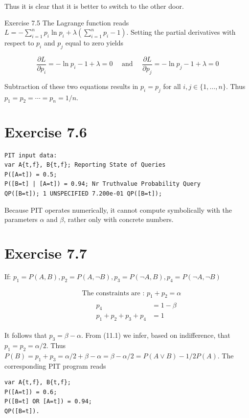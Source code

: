 \documentclass[10pt]{book}
\begin{document}
\begin{center}
\begin{enumerate}
\begin{center}
\begin{center}
\begin{center}
\begin{center}
\begin{center}
Thus it is clear that it is better to switch to the other door.

Exercise 7.5 The Lagrange function reads $L=-\sum_{i=1}^{n} p_{i} \ln p_{i}+\lambda\left(\sum_{i=1}^{n} p_{i}-1\right)$. Setting the partial derivatives with respect to $p_{i}$ and $p_{j}$ equal to zero yields

$$
\frac{\partial L}{\partial p_{i}}=-\ln p_{i}-1+\lambda=0 \quad \text { and } \quad \frac{\partial L}{\partial p_{j}}=-\ln p_{j}-1+\lambda=0
$$

Subtraction of these two equations results in $p_{i}=p_{j}$ for all $i, j \in\{1, \ldots, n\}$. Thus $p_{1}=p_{2}=\cdots=p_{n}=1 / n$.

\section*{Exercise 7.6}
\begin{verbatim}
PIT input data:
var A{t,f}, B{t,f}; Reporting State of Queries
P([A=t]) = 0.5;
P([B=t] | [A=t]) = 0.94; Nr Truthvalue Probability Query
QP([B=t]); 1 UNSPECIFIED 7.200e-01 QP([B=t]);
\end{verbatim}

Because PIT operates numerically, it cannot compute symbolically with the parameters $\alpha$ and $\beta$, rather only with concrete numbers.

\section*{Exercise 7.7}
If: $p_{1}=P(A, B), p_{2}=P(A, \neg B), p_{3}=P(\neg A, B), p_{4}=P(\neg A, \neg B)$


\begin{align*}
& \text { The constraints are : } p_{1}+p_{2}=\alpha  \tag{11.1}\\
& \qquad \begin{aligned}
p_{4} & =1-\beta \\
p_{1}+p_{2}+p_{3}+p_{4} & =1
\end{aligned} \tag{11.2}
\end{align*}


It follows that $p_{3}=\beta-\alpha$. From (11.1) we infer, based on indifference, that $p_{1}=p_{2}=\alpha / 2$. Thus $P(B)=p_{1}+p_{3}=\alpha / 2+\beta-\alpha=\beta-\alpha / 2=P(A \vee B)-1 / 2 P(A)$. The corresponding PIT program reads

\begin{verbatim}
var A{t,f}, B{t,f};
P([A=t]) = 0.6;
P([B=t] OR [A=t]) = 0.94;
QP([B=t]).
\end{verbatim}


\end{center}
\end{center}
\end{center}
\end{center}
\end{center}
\end{enumerate}
\end{center}
\end{document}
